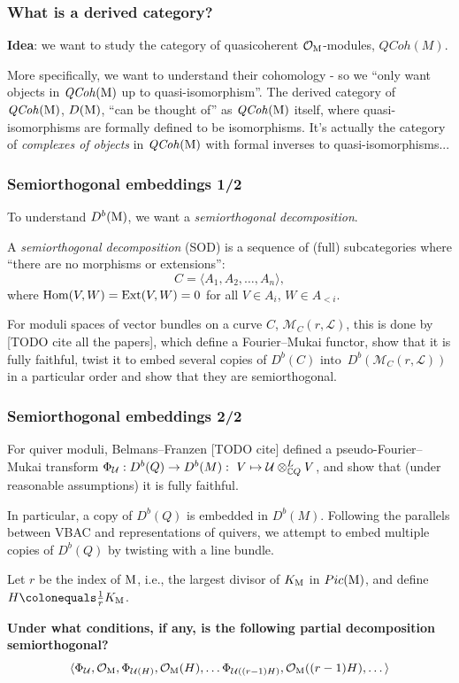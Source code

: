\documentclass{beamer}
\begin{document}
\begin{frame}
    \frametitle{What is a derived category?}
\textbf{Idea}: we want to study the category of
quasicoherent $\mathcal{O}_{\operatorname{M}}$-modules, $\mathit{QCoh}(M)$.

More specifically, we want to understand their cohomology -
so we ``only want objects in $\mathit{QCoh}(\operatorname{M})$ up to quasi-isomorphism''. \pause
\vfill
The derived category of $\mathit{QCoh}(\operatorname{M})$, $D(\operatorname{M})$,
``can be thought of'' as $\mathit{QCoh}(\operatorname{M})$ itself, where quasi-isomorphisms are
formally defined to be isomorphisms. \pause
\vfill
\small{It's actually the category of \emph{complexes of objects} in $\mathit{QCoh}(\operatorname{M})$
with formal inverses to quasi-isomorphisms...}

\end{frame}
\begin{frame}
    \frametitle{Semiorthogonal embeddings 1/2}
To understand $D^b(\operatorname{M})$, we want a \emph{semiorthogonal decomposition}.

\begin{definition}
A \emph{semiorthogonal decomposition} (SOD) is a sequence of (full) subcategories
where ``there are no morphisms or extensions'':
\[
   \mathit{C} = \langle A_1, A_2, \dots, A_n \rangle,
\]
where $\operatorname{Hom}(V, W) = \operatorname{Ext}(V, W) = 0$ for all $V \in A_i$, $W \in A_{< i}$.
\end{definition}\pause

For moduli spaces of vector bundles on a curve $C$,
$\mathcal{M}_{C}(r, \mathcal{L})$, this is done by
[TODO cite all the papers], which define a Fourier--Mukai functor, show that it is
fully faithful, twist it to embed several copies of $D^b(C)$
into~$D^b(\mathcal{M}_{C}(r, \mathcal{L}))$ in a particular order and show
that they are semiorthogonal.

\end{frame}

\begin{frame}
    \frametitle{Semiorthogonal embeddings 2/2}
For quiver moduli, Belmans--Franzen [TODO cite]
defined a pseudo-Fourier--Mukai transform
$\Phi_{\mathcal{U}} : D^b(Q) \overset{}{\rightarrow} D^b(M) :~V \mapsto \mathcal{U} \otimes_{\mathbb{C} Q}^{L} V$,
and show that (under reasonable assumptions) it is fully faithful.

In particular, a copy of $D^b(Q)$ is embedded in $D^b(M)$. \pause
    Following the parallels between VBAC and representations of quivers,
we attempt to embed multiple copies of $D^b(Q)$ by twisting with a line bundle. \pause

Let $r$ be the index of $\operatorname{M}$, i.e.,
the largest divisor of $K_{\operatorname{M}}$ in $Pic(\operatorname{M})$, and
define $H \colonequals \frac{1}{r}K_{\modulispace}$. \pause

\textbf{Under what conditions, if any, is the following partial decomposition semiorthogonal?}
\[
    \langle
    \Phi_{\mathcal{U}}, \mathcal{O}_{\operatorname{M}},
    \Phi_{\mathcal{U}(H)}, \mathcal{O}_{\operatorname{M}}(H), \dots
    \Phi_{\mathcal{U}((r-1)H)}, \mathcal{O}_{\operatorname{M}}((r-1)H), \dots
    \rangle
\]
\end{frame}
\end{document}
